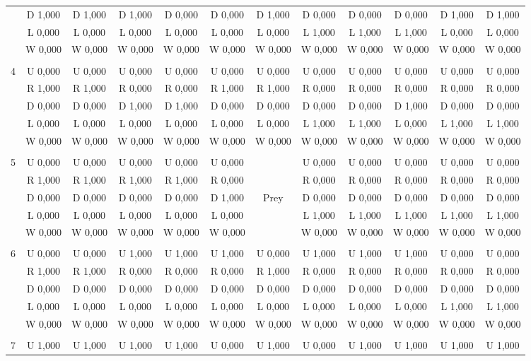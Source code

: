 \begin{table}[htbp]
\begin{tiny}
\begin{tabular}{c|c|c|c|c|c|c|c|c|c|c|c|}
&D 1,000&D 1,000&D 1,000&D 0,000&D 0,000&D 1,000&D 0,000&D 0,000&D 0,000&D 1,000&D 1,000\\
&L 0,000&L 0,000&L 0,000&L 0,000&L 0,000&L 0,000&L 1,000&L 1,000&L 1,000&L 0,000&L 0,000\\
&W 0,000&W 0,000&W 0,000&W 0,000&W 0,000&W 0,000&W 0,000&W 0,000&W 0,000&W 0,000&W 0,000\\
\hline \\
4&U 0,000&U 0,000&U 0,000&U 0,000&U 0,000&U 0,000&U 0,000&U 0,000&U 0,000&U 0,000&U 0,000\\
&R 1,000&R 1,000&R 0,000&R 0,000&R 1,000&R 1,000&R 0,000&R 0,000&R 0,000&R 0,000&R 0,000\\
&D 0,000&D 0,000&D 1,000&D 1,000&D 0,000&D 0,000&D 0,000&D 0,000&D 1,000&D 0,000&D 0,000\\
&L 0,000&L 0,000&L 0,000&L 0,000&L 0,000&L 0,000&L 1,000&L 1,000&L 0,000&L 1,000&L 1,000\\
&W 0,000&W 0,000&W 0,000&W 0,000&W 0,000&W 0,000&W 0,000&W 0,000&W 0,000&W 0,000&W 0,000\\
\hline \\
5&U 0,000&U 0,000&U 0,000&U 0,000&U 0,000&&U 0,000&U 0,000&U 0,000&U 0,000&U 0,000\\
&R 1,000&R 1,000&R 1,000&R 1,000&R 0,000&&R 0,000&R 0,000&R 0,000&R 0,000&R 0,000\\
&D 0,000&D 0,000&D 0,000&D 0,000&D 1,000&Prey&D 0,000&D 0,000&D 0,000&D 0,000&D 0,000\\
&L 0,000&L 0,000&L 0,000&L 0,000&L 0,000&&L 1,000&L 1,000&L 1,000&L 1,000&L 1,000\\
&W 0,000&W 0,000&W 0,000&W 0,000&W 0,000&&W 0,000&W 0,000&W 0,000&W 0,000&W 0,000\\
\hline \\
6&U 0,000&U 0,000&U 1,000&U 1,000&U 1,000&U 0,000&U 1,000&U 1,000&U 1,000&U 0,000&U 0,000\\
&R 1,000&R 1,000&R 0,000&R 0,000&R 0,000&R 1,000&R 0,000&R 0,000&R 0,000&R 0,000&R 0,000\\
&D 0,000&D 0,000&D 0,000&D 0,000&D 0,000&D 0,000&D 0,000&D 0,000&D 0,000&D 0,000&D 0,000\\
&L 0,000&L 0,000&L 0,000&L 0,000&L 0,000&L 0,000&L 0,000&L 0,000&L 0,000&L 1,000&L 1,000\\
&W 0,000&W 0,000&W 0,000&W 0,000&W 0,000&W 0,000&W 0,000&W 0,000&W 0,000&W 0,000&W 0,000\\
\hline \\
7&U 1,000&U 1,000&U 1,000&U 1,000&U 0,000&U 1,000&U 0,000&U 1,000&U 1,000&U 1,000&U 1,000\\

\end{tabular}
\end{tiny}
\end{table}
